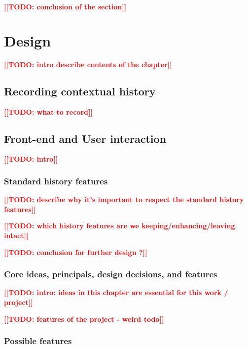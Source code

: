 \documentclass[thesis=M,english]{FITthesis}[2012/10/20]
\newcommand{\todotext}[1]{\textcolor{red}{\textbf{[[#1]]}}}
\newcommand{\blind}[1][1]{\textcolor{mygray}{\Blindtext[#1][1]}}
\begin{document}
\todotext{TODO: conclusion of the section}



\chapter{Design}
\todotext{TODO: intro describe contents of the chapter}

\blind
{}
\section{Recording contextual history}

\todotext{TODO: what to record}

\blind[2]

\section{Front-end and User interaction}

\todotext{TODO: intro}

\blind

\subsection{Standard history features}

\todotext{TODO: describe why it's important to respect the standard history features}

\todotext{TODO: which history features are we keeping/enhancing/leaving intact}

\blind[3]

\todotext{TODO: conclusion for further design ?}



\subsection{Core ideas, principals, design decisions, and features}

\todotext{TODO: intro: ideas in this chapter are essential for this work / project}

\todotext{TODO: features of the project - weird todo}

\blind[3]

\subsection{Possible features}
\end{document}
